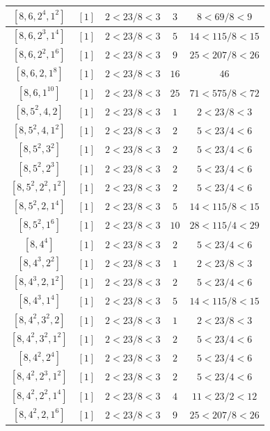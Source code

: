 \documentclass{article}%
\begin{document}
\begin{center}
\begin{longtable}{||c|c|c|c|c||}
$[8, 6, 2^{4}, 1^{2}]$ & $[1]$ & $2 < 23/8 < 3$ & $3$ & $8 < 69/8 < 9$ \\ \hline 
$[8, 6, 2^{3}, 1^{4}]$ & $[1]$ & $2 < 23/8 < 3$ & $5$ & $14 < 115/8 < 15$ \\ \hline 
$[8, 6, 2^{2}, 1^{6}]$ & $[1]$ & $2 < 23/8 < 3$ & $9$ & $25 < 207/8 < 26$ \\ \hline 
$[8, 6, 2, 1^{8}]$ & $[1]$ & $2 < 23/8 < 3$ & $16$ & $46$ \\ \hline 
$[8, 6, 1^{10}]$ & $[1]$ & $2 < 23/8 < 3$ & $25$ & $71 < 575/8 < 72$ \\ \hline 
$[8, 5^{2}, 4, 2]$ & $[1]$ & $2 < 23/8 < 3$ & $1$ & $2 < 23/8 < 3$ \\ \hline 
$[8, 5^{2}, 4, 1^{2}]$ & $[1]$ & $2 < 23/8 < 3$ & $2$ & $5 < 23/4 < 6$ \\ \hline 
$[8, 5^{2}, 3^{2}]$ & $[1]$ & $2 < 23/8 < 3$ & $2$ & $5 < 23/4 < 6$ \\ \hline 
$[8, 5^{2}, 2^{3}]$ & $[1]$ & $2 < 23/8 < 3$ & $2$ & $5 < 23/4 < 6$ \\ \hline 
$[8, 5^{2}, 2^{2}, 1^{2}]$ & $[1]$ & $2 < 23/8 < 3$ & $2$ & $5 < 23/4 < 6$ \\ \hline 
$[8, 5^{2}, 2, 1^{4}]$ & $[1]$ & $2 < 23/8 < 3$ & $5$ & $14 < 115/8 < 15$ \\ \hline 
$[8, 5^{2}, 1^{6}]$ & $[1]$ & $2 < 23/8 < 3$ & $10$ & $28 < 115/4 < 29$ \\ \hline 
$[8, 4^{4}]$ & $[1]$ & $2 < 23/8 < 3$ & $2$ & $5 < 23/4 < 6$ \\ \hline 
$[8, 4^{3}, 2^{2}]$ & $[1]$ & $2 < 23/8 < 3$ & $1$ & $2 < 23/8 < 3$ \\ \hline 
$[8, 4^{3}, 2, 1^{2}]$ & $[1]$ & $2 < 23/8 < 3$ & $2$ & $5 < 23/4 < 6$ \\ \hline 
$[8, 4^{3}, 1^{4}]$ & $[1]$ & $2 < 23/8 < 3$ & $5$ & $14 < 115/8 < 15$ \\ \hline 
$[8, 4^{2}, 3^{2}, 2]$ & $[1]$ & $2 < 23/8 < 3$ & $1$ & $2 < 23/8 < 3$ \\ \hline 
$[8, 4^{2}, 3^{2}, 1^{2}]$ & $[1]$ & $2 < 23/8 < 3$ & $2$ & $5 < 23/4 < 6$ \\ \hline 
$[8, 4^{2}, 2^{4}]$ & $[1]$ & $2 < 23/8 < 3$ & $2$ & $5 < 23/4 < 6$ \\ \hline 
$[8, 4^{2}, 2^{3}, 1^{2}]$ & $[1]$ & $2 < 23/8 < 3$ & $2$ & $5 < 23/4 < 6$ \\ \hline 
$[8, 4^{2}, 2^{2}, 1^{4}]$ & $[1]$ & $2 < 23/8 < 3$ & $4$ & $11 < 23/2 < 12$ \\ \hline 
$[8, 4^{2}, 2, 1^{6}]$ & $[1]$ & $2 < 23/8 < 3$ & $9$ & $25 < 207/8 < 26$ \\ \hline 

\end{longtable}
\end{center}
\end{document}
